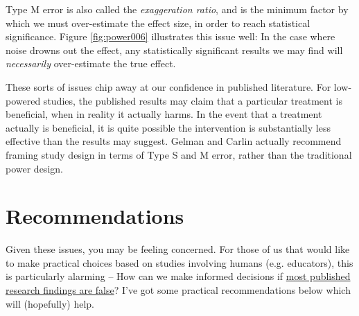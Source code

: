 \documentclass{tufte-handout}
\begin{document}
Type M error is also called the \emph{exaggeration ratio}, and is the minimum factor
by which we must over-estimate the effect size, in order to reach statistical
significance. Figure \ref{fig:power006} illustrates this issue well: In the case
where noise drowns out the effect, any statistically significant results we may
find will \emph{necessarily} over-estimate the true effect.

These sorts of issues chip away at our confidence in published literature. For
low-powered studies, the published results may claim that a particular treatment
is beneficial, when in reality it actually harms. In the event that a treatment
actually is beneficial, it is quite possible the intervention is substantially
less effective than the results may suggest. Gelman and Carlin actually
recommend framing study design in terms of Type S and M error, rather than the
traditional power design.

\section{Recommendations}
\label{sec:orgcbf2fd0}
Given these issues, you may be feeling concerned. For those of us that would
like to make practical choices based on studies involving humans (e.g.
educators), this is particularly alarming -- How can we make informed decisions
if \href{http://journals.plos.org/plosmedicine/article?id=10.1371/journal.pmed.0020124}{most published research findings are false}?\cite{ioannidis2005most} I've got
some practical recommendations below which will (hopefully) help.
\end{document}
